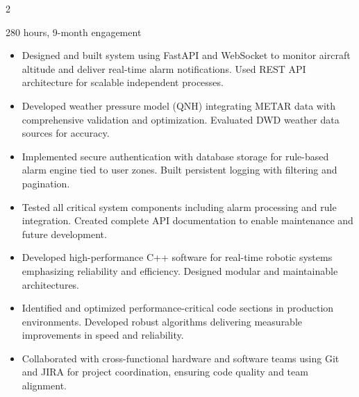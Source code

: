 \documentclass[10pt,a4paper,ragged2e,withhyper]{altacv}
\begin{document}
\begin{paracol}{2}
	{\small\color{LightGrey}280 hours, 9-month engagement\par}
	\vspace{0.05em}
	\begin{itemize}
		\item Designed and built system using FastAPI and WebSocket to monitor aircraft altitude and deliver real-time alarm notifications. Used REST API architecture for scalable independent processes.
		\item Developed weather pressure model (QNH) integrating METAR data with comprehensive validation and optimization. Evaluated DWD weather data sources for accuracy.
		\item Implemented secure authentication with database storage for rule-based alarm engine tied to user zones. Built persistent logging with filtering and pagination.
		\item Tested all critical system components including alarm processing and rule integration. Created complete API documentation to enable maintenance and future development.
	\end{itemize}

	\vspace{0.3em}
	\divider
	\vspace{0.3em}

	\vspace{0.05em}
	\begin{itemize}
		\item Developed high-performance C++ software for real-time robotic systems emphasizing reliability and efficiency. Designed modular and maintainable architectures.
		\item Identified and optimized performance-critical code sections in production environments. Developed robust algorithms delivering measurable improvements in speed and reliability.
		\item Collaborated with cross-functional hardware and software teams using Git and JIRA for project coordination, ensuring code quality and team alignment.
	\end{itemize}

	\switchcolumn


	{\LaTeXraggedright
		\par}


\end{paracol}
\end{document}
